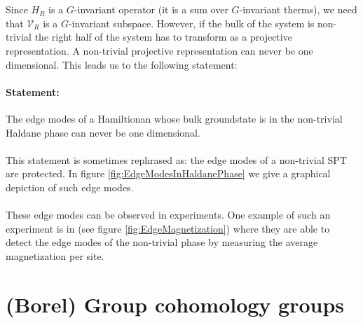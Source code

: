 \\\\
Since $H_R$ is a $G$-invariant operator (it is a sum over $G$-invariant therms), we need that $\mathcal{V}_R$ is a $G$-invariant subspace. However, if the bulk of the system is non-trivial the right half of the system has to transform as a projective representation. A non-trivial projective representation can never be one dimensional. This leads us to the following statement:
\paragraph{Statement:}The edge modes of a Hamiltionan whose bulk groundstate is in the non-trivial Haldane phase can never be one dimensional.
\\\\
This statement is sometimes rephrased as: the edge modes of a non-trivial SPT are protected. In figure \ref{fig:EdgeModesInHaldanePhase} we give a graphical depiction of such edge modes.
\\\\
These edge modes can be observed in experiments. One example of such an experiment is in \cite{sompet2022realizing} (see figure \ref{fig:EdgeMagnetization}) where they are able to detect the edge modes of the non-trivial phase by measuring the average magnetization per site. 
\section{(Borel) Group cohomology groups}
